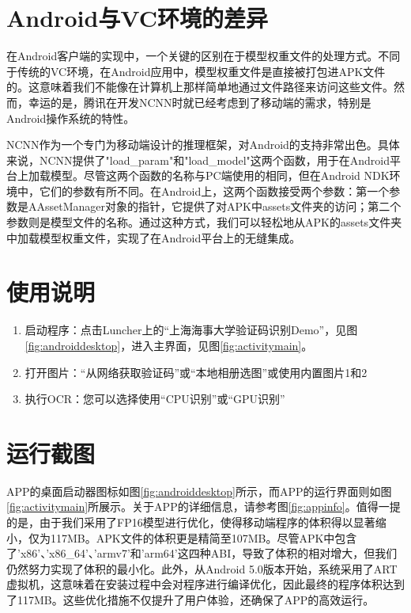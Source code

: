 \section{Android与VC环境的差异}

在Android客户端的实现中，一个关键的区别在于模型权重文件的处理方式。不同于传统的VC环境，在Android应用中，模型权重文件是直接被打包进APK文件的。这意味着我们不能像在计算机上那样简单地通过文件路径来访问这些文件。然而，幸运的是，腾讯在开发NCNN时就已经考虑到了移动端的需求，特别是Android操作系统的特性。

NCNN作为一个专门为移动端设计的推理框架，对Android的支持非常出色。具体来说，NCNN提供了"load\_param"和"load\_model"这两个函数，用于在Android平台上加载模型。尽管这两个函数的名称与PC端使用的相同，但在Android NDK环境中，它们的参数有所不同。在Android上，这两个函数接受两个参数：第一个参数是AAssetManager对象的指针，它提供了对APK中assets文件夹的访问；第二个参数则是模型文件的名称。通过这种方式，我们可以轻松地从APK的assets文件夹中加载模型权重文件，实现了在Android平台上的无缝集成。

\section{使用说明}

\begin{enumerate}
	\item 启动程序：点击Luncher上的“上海海事大学验证码识别Demo”，见图\ref{fig:androiddesktop}，进入主界面，见图\ref{fig:activitymain}。
	\item 打开图片：“从网络获取验证码”或“本地相册选图”或使用内置图片1和2
	\item 执行OCR：您可以选择使用“CPU识别”或“GPU识别”
\end{enumerate}

\section{运行截图}

APP的桌面启动器图标如图\ref{fig:androiddesktop}所示，而APP的运行界面则如图\ref{fig:activitymain}所展示。关于APP的详细信息，请参考图\ref{fig:appinfo}。值得一提的是，由于我们采用了FP16模型进行优化，使得移动端程序的体积得以显著缩小，仅为117MB。APK文件的体积更是精简至107MB。尽管APK中包含了'x86'、'x86\_64'、'armv7'和'arm64'这四种ABI，导致了体积的相对增大，但我们仍然努力实现了体积的最小化。此外，从Android 5.0版本开始，系统采用了ART虚拟机，这意味着在安装过程中会对程序进行编译优化，因此最终的程序体积达到了117MB。这些优化措施不仅提升了用户体验，还确保了APP的高效运行。

